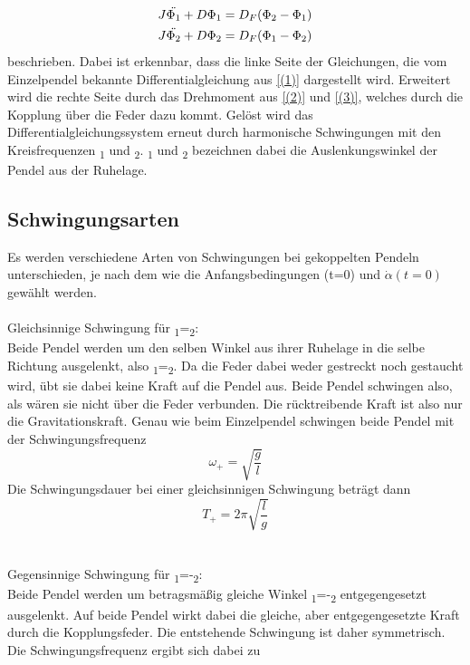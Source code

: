 \documentclass[titlepage=firstcover, captions=tableheading]{scrartcl}
\begin{document}
\begin{align}
    J\ddot{\Phi_1}+D\Phi_1=D_F(\Phi_2-\Phi_1) \notag\\
    J\ddot{\Phi_2}+D\Phi_2=D_F(\Phi_1-\Phi_2) \notag
\end{align} 
beschrieben. Dabei ist erkennbar, dass die linke Seite der Gleichungen, die vom Einzelpendel bekannte Differentialgleichung aus \ref*{(1)} dargestellt wird. Erweitert wird die rechte Seite durch das Drehmoment aus \ref*{(2)} und \ref*{(3)}, welches durch die Kopplung über die Feder dazu kommt. Gelöst wird das Differentialgleichungssystem erneut durch harmonische Schwingungen mit den Kreisfrequenzen \omega\textsubscript{1} und \omega\textsubscript{2}. \alpha\textsubscript{1} und \alpha\textsubscript{2} bezeichnen dabei die Auslenkungswinkel der Pendel aus der Ruhelage.
\newpage
\subsection{Schwingungsarten}
Es werden verschiedene Arten von Schwingungen bei gekoppelten Pendeln unterschieden, je nach dem wie die Anfangsbedingungen \alpha(t=0) und $\dot{\alpha}(t=0)$ gewählt werden.\\\\
\noindent Gleichsinnige Schwingung für \alpha\textsubscript{1}=\alpha\textsubscript{2}:\\
Beide Pendel werden um den selben Winkel \alpha aus ihrer Ruhelage in die selbe Richtung ausgelenkt, also \alpha\textsubscript{1}=\alpha\textsubscript{2}. Da die Feder dabei weder gestreckt noch gestaucht wird, übt sie dabei keine Kraft auf die Pendel aus. Beide Pendel schwingen also, als wären sie nicht über die Feder verbunden. Die rücktreibende Kraft ist also nur die Gravitationskraft. Genau wie beim Einzelpendel schwingen beide Pendel mit der Schwingungsfrequenz
\begin{displaymath}
    \omega_+=\sqrt{\frac{g}{l}}
\end{displaymath}
Die Schwingungsdauer bei einer gleichsinnigen Schwingung beträgt dann 
\begin{displaymath}
    T_+ =2\pi\sqrt{\frac{l}{g}}
\end{displaymath}
\\\\
\noindent Gegensinnige Schwingung für \alpha\textsubscript{1}=-\alpha\textsubscript{2}:\\
Beide Pendel werden um betragsmäßig gleiche Winkel \alpha\textsubscript{1}=-\alpha\textsubscript{2} entgegengesetzt ausgelenkt. Auf beide Pendel wirkt dabei die gleiche, aber entgegengesetzte Kraft durch die Kopplungsfeder. Die entstehende Schwingung ist daher symmetrisch. Die Schwingungsfrequenz ergibt sich dabei zu 
\end{document}
